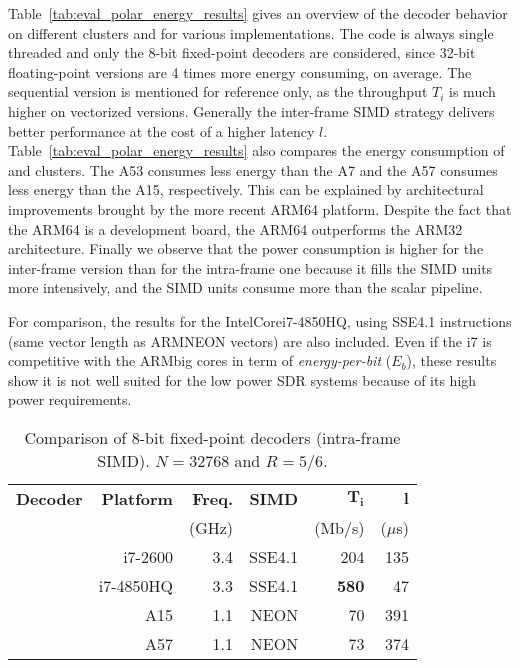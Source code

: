 Table~\ref{tab:eval_polar_energy_results} gives an overview of the decoder
behavior on different clusters and for various implementations. The code is
always single threaded and only the 8-bit fixed-point decoders are considered,
since 32-bit floating-point versions  are 4 times more energy consuming, on
average. The sequential version is mentioned for reference only, as the
throughput $T_i$ is much higher on vectorized versions. Generally the
inter-frame SIMD strategy delivers better performance at the cost of a higher
latency $l$. Table~\ref{tab:eval_polar_energy_results} also compares the energy
consumption of \little and \big clusters. The A53 consumes less energy than the
A7 and the A57 consumes less energy than the A15, respectively. This can be
explained by architectural improvements brought by the more recent ARM64
platform. Despite the fact that the ARM64 is a development board, the ARM64
outperforms the ARM32 architecture. Finally we observe that the power
consumption is higher for the inter-frame version than for the intra-frame one
because it fills the SIMD units more intensively, and the SIMD units consume
more than the scalar pipeline.

For comparison, the results for the Intel\R Core\TM i7-4850HQ, using SSE4.1
instructions (same vector length as ARM\R NEON vectors) are also included. Even
if the i7 is competitive with the ARM\R big cores in term of
\textit{energy-per-bit} ($E_b$), these results show it is not well suited for
the low power SDR systems because of its high power requirements.

\begin{table}[htp]
  \caption{Comparison of 8-bit fixed-point decoders (intra-frame SIMD).
    $N = 32768$ and $R = 5/6$.}
  \label{tab:eval_polar_energy_comparison}
  \begin{center}
  \begin{tabular}{r r r r r r}
    \textbf{Decoder} & \textbf{Platform} & \textbf{Freq.} & \textbf{SIMD} & $\bm{T_i}$ & $\bm{l}$ \\
                     &                   &          (GHz) &               &     (Mb/s) & ($\mu$s) \\
    \hline
    \hline
    \cite{Giard2014}     & i7-2600   & 3.4 & SSE4.1 &         204  &  135 \\ %
    \cite{Cassagne2016b} & i7-4850HQ & 3.3 & SSE4.1 & \textbf{580} &   47 \\ %
    \cite{Cassagne2016b} & A15       & 1.1 & NEON   &          70  &  391 \\ %
    \cite{Cassagne2016b} & A57       & 1.1 & NEON   &          73  &  374 \\
  \end{tabular}
  \end{center}
\end{table}


